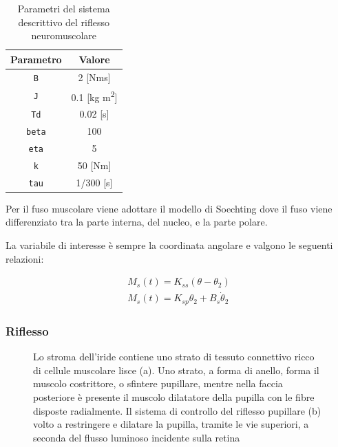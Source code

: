 \begin{table}[t!]
	\centering
	\begin{tabular}{|c|c|}
		\hline
		Parametro & Valore \\
		\hline
		\texttt{B} & 2 [Nms] \\
		\hline
		\texttt{J} & 0.1 [kg m\textsuperscript{2}] \\
		\hline
		\texttt{Td} & 0.02 [s] \\
		\hline
		\texttt{beta} & 100 \\
		\hline
		\texttt{eta} & 5 \\
		\hline
		\texttt{k} & 50 [Nm] \\
		\hline
		\texttt{tau} & 1/300 [s] \\
		\hline
	\end{tabular}
	\caption{Parametri del sistema descrittivo del riflesso neuromuscolare}
	\label{tab:parametriMuscolo}
\end{table}


Per il fuso muscolare viene adottare il modello di Soechting \cite{mains_model_1971} dove il fuso viene differenziato tra la parte interna, del nucleo, e la parte polare.

La variabile di interesse è sempre la coordinata angolare e valgono le seguenti relazioni:

\begin{equation}
	\begin{gathered}
		M_{s}(t)=K_{s s}\left(\theta-\theta_{2}\right) \\
		M_{s}(t)=K_{s p}  \theta_{2}+B_{s} \dot{\theta}_{2}
	\end{gathered}
\end{equation}

\subsubsection{Riflesso}

\begin{figure}[t!]
	\centering
	\begin{subfigure}{0.6\linewidth}
		\centering
		\tiny{\def\svgwidth{0.95\linewidth}
			}
		\caption{}
	\end{subfigure}\hfill
	\begin{subfigure}{0.4\linewidth}
		\centering
		\tiny{\def\svgwidth{0.95\linewidth}
			}
		\caption{}
	\end{subfigure}
	\caption{Lo stroma dell'iride contiene uno strato di tessuto connettivo ricco di cellule muscolare lisce (a). Uno strato, a forma di anello, forma il muscolo costrittore, o sfintere pupillare, mentre nella faccia posteriore è presente il muscolo dilatatore della pupilla con le fibre disposte radialmente. Il sistema di controllo del riflesso pupillare (b) volto a restringere e dilatare la pupilla, tramite le vie superiori, a seconda del flusso luminoso incidente sulla retina}
	\label{fig:pupilla}
\end{figure}

